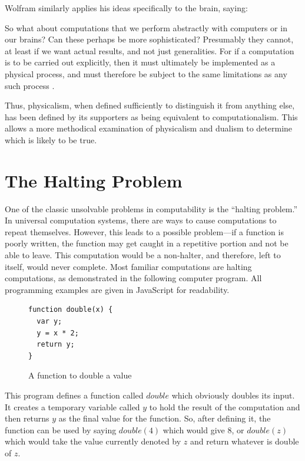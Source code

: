 Wolfram similarly applies his ideas specifically to the brain, saying:

\begin{quoting}
So what about computations that we perform abstractly with computers or in our brains?  Can these perhaps be more sophisticated?  Presumably they cannot, at least if we want  actual results, and not just generalities.  For if a computation is to be carried out explicitly, then it must ultimately be implemented as a physical process, and must therefore be subject to the same limitations as any such process \citep[][p.~721]{wolfram2002}.
\end{quoting}

Thus, physicalism, when defined sufficiently to distinguish it from anything else, has been defined by its supporters as being equivalent to computationalism.  This allows a more methodical examination of physicalism and dualism to determine which is likely to be true.

\section{The Halting Problem}

One of the classic unsolvable problems in computability is the ``halting problem.''  In universal computation systems, there are ways to cause computations to repeat themselves.  However, this leads to a possible problem---if a function is poorly written, the function may get caught in a repetitive portion and not be able to leave.  This computation would be a non-halter, and therefore, left to itself, would never complete.  Most familiar computations are halting computations, as demonstrated in the following computer program. All programming examples are given in JavaScript for readability.

\begin{figure}[H]
\begin{mdframed}
\begin{verbatim}
function double(x) {
  var y;
  y = x * 2;
  return y;
}
\end{verbatim}
\end{mdframed}
\caption{A function to double a value}
\end{figure}

This program defines a function called $double$ which obviously doubles its input.  It creates a temporary variable called $y$ to hold the result of the computation and then returns $y$ as the final value for the function.  So, after defining it, the function can be used by saying $double(4)$ which would give $8$, or $double(z)$ which would take the value currently denoted by $z$ and return whatever is double of $z$.

